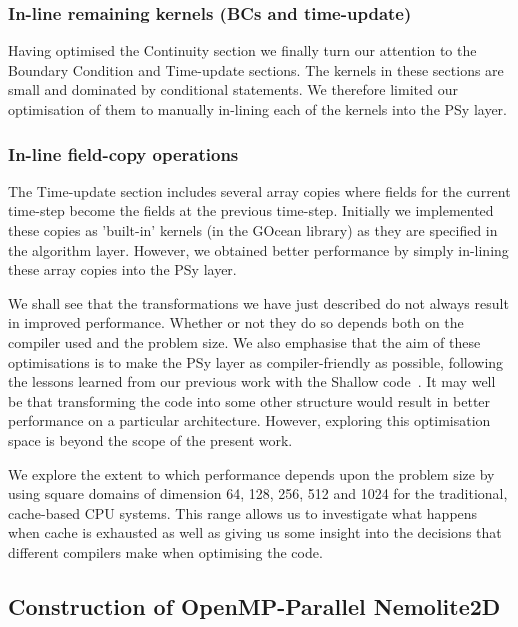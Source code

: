 \documentclass[journal]{IEEEtran}
\begin{document}
\subsubsection{In-line remaining kernels (BCs and time-update)}
\label{sec_inline_all_kernels}

Having optimised the Continuity section we finally turn our attention
to the Boundary Condition and Time-update sections. The kernels in
these sections are small and dominated by conditional statements.  We
therefore limited our optimisation of them to manually in-lining each
of the kernels into the PSy layer.

\subsubsection{In-line field-copy operations}
\label{sec_inline_fldcopy}

The Time-update section includes several array copies where fields for
the current time-step become the fields at the previous time-step.
Initially we implemented these copies as 'built-in' kernels (in the
GOcean library) as they are specified in the algorithm layer. However,
we obtained better performance by simply in-lining these array copies
into the PSy layer.

We shall see that the transformations we have just described do not
always result in improved performance. Whether or not they do so
depends both on the compiler used and the problem size. We also
emphasise that the aim of these optimisations is to make the PSy layer
as compiler-friendly as possible, following the lessons learned from
our previous work with the Shallow code~\cite{shallow_psykal}. It may
well be that transforming the code into some other structure would
result in better performance on a particular architecture. However,
exploring this optimisation space is beyond the scope of the present
work.

We explore the extent to which performance depends upon the problem
size by using square domains of dimension 64, 128, 256, 512 and 1024
for the traditional, cache-based CPU systems. This range allows us to
investigate what happens when cache is exhausted as well as giving us
some insight into the decisions that different compilers make when
optimising the code.

\subsection{Construction of OpenMP-Parallel Nemolite2D}
\label{sec_omp_steps}
\end{document}
